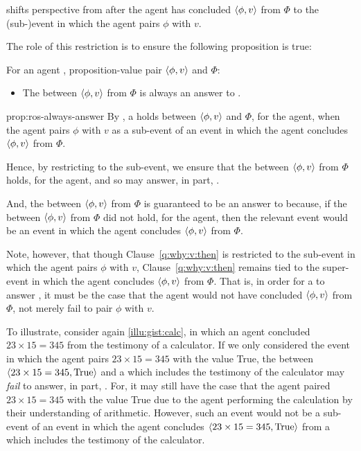 \begin{note}
  \qWhyV{} shifts perspective from after the agent has concluded \(\langle \phi, v \rangle\) from \(\Phi\) to the (sub-)event in which the agent pairs \(\phi\) with \(v\).

  The role of this restriction is to ensure the following proposition is true:

  \begin{proposition}
    \label{prop:ros-always-answer}
    For an agent \vAgent{}, proposition-value pair \(\langle \phi, v \rangle\) and \poP{} \(\Phi\):

    \begin{itemize}
    \item
      The \ros{} between \(\langle \phi, v \rangle\) from \(\Phi\) is always an answer to \qWhyV{}.
    \end{itemize}
    \vspace{-\baselineskip}
  \end{proposition}

  \begin{argument}{prop:ros-always-answer}
    By \supportI{}, a \ros{} holds between \(\langle \phi, v \rangle\) and \(\Phi\), for the agent, when the agent pairs \(\phi\) with \(v\) as a sub-event of an event in which the agent concludes \(\langle \phi, v \rangle\) from \(\Phi\).

    Hence, by restricting \qWhyV{} to the sub-event, we ensure that the \ros{} between \(\langle \phi, v \rangle\) from \(\Phi\) holds, for the agent, and so may answer, in part, \qWhyV{}.

    And, the \ros{} between \(\langle \phi, v \rangle\) from \(\Phi\) is guaranteed to be an answer to \qWhyV{} because, if the \ros{} between \(\langle \phi, v \rangle\) from \(\Phi\) did not hold, for the agent, then the relevant event would be an event in which the agent concludes \(\langle \phi, v \rangle\) from \(\Phi\).
    \end{argument}


  Note, however, that though Clause~\ref{q:why:v:then} is restricted to the sub-event in which the agent pairs \(\phi\) with \(v\), Clause~\ref{q:why:v:then} remains tied to the super-event in which the agent concludes \(\langle \phi, v \rangle\) from \(\Phi\).
  That is, in order for a \ros{} to answer \qWhyV{}, it must be the case that the agent would not have concluded \(\langle \phi, v \rangle\) from \(\Phi\), not merely fail to pair \(\phi\) with \(v\).

  To illustrate, consider again \autoref{illu:gist:calc}, in which an agent concluded \(23 \times 15 = 345\) from the testimony of a calculator.
  If we only considered the event in which the agent pairs \(23 \times 15 = 345\) with the value True, the \ros{} between \(\langle 23 \times 15 = 345, \text{True} \rangle\) and a \poP{} which includes the testimony of the calculator may \emph{fail} to answer, in part, \qWhyV{}.
  For, it may still have the case that the agent paired \(23 \times 15 = 345\) with the value True due to the agent performing the calculation by their understanding of arithmetic.
  However, such an event would not be a sub-event of an event in which the agent concludes \(\langle 23 \times 15 = 345, \text{True} \rangle\) from a \poP{} which includes the testimony of the calculator.
\end{note}

